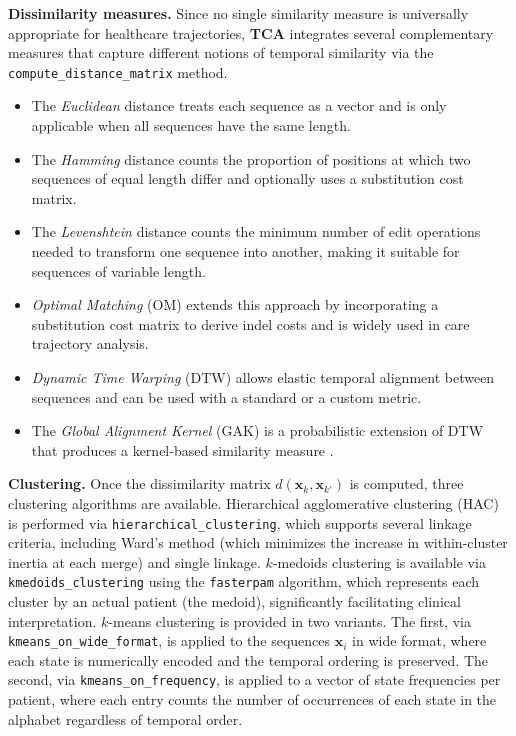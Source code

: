 \documentclass[pdflatex,sn-mathphys-num,referee,lineno]{sn-jnl}
\newcommand{\code}[1]{\texttt{#1}}
\newcommand{\pkg}[1]{\textbf{#1}}
\begin{document}
\textbf{Dissimilarity measures.}
Since no single similarity measure is universally appropriate for healthcare trajectories, \pkg{TCA} integrates several complementary measures that capture different notions of temporal similarity via the \code{compute\_distance\_matrix} method. 
\begin{itemize}
  \item The \emph{Euclidean} distance treats each sequence as a vector and is only applicable when all sequences have the same length. 
  \item The \emph{Hamming} distance counts the proportion of positions at which two sequences of equal length differ and optionally uses a substitution cost matrix.
  \item The \emph{Levenshtein} distance \citep{levenshtein1966binary} counts the minimum number of edit operations needed to transform one sequence into another, making it suitable for sequences of variable length.
  \item \emph{Optimal Matching} (OM) \citep{andjohn1986optimal} extends this approach by incorporating a substitution cost matrix to derive indel costs and is widely used in care trajectory analysis.
  \item \emph{Dynamic Time Warping} (DTW) allows elastic temporal alignment between sequences and can be used with a standard or a custom metric. 
  \item The \emph{Global Alignment Kernel} (GAK) is a probabilistic extension of DTW that produces a kernel-based similarity measure \citep{denteuling2026clustering}.
\end{itemize}

\textbf{Clustering.}
Once the dissimilarity matrix $d(\boldsymbol{x}_k, \boldsymbol{x}_{k'})$ is computed, three clustering algorithms are available. 
Hierarchical agglomerative clustering (HAC) is performed via \code{hierarchical\_clustering}, which supports several linkage criteria, including Ward's method (which minimizes the increase in within-cluster inertia at each merge) and single linkage. 
$k$-medoids clustering \citep{denteuling2026clustering} is available via \code{kmedoids\_clustering} using the \code{fasterpam} algorithm, which represents each cluster by an actual patient (the medoid), significantly facilitating clinical interpretation. 
$k$-means clustering is provided in two variants. The first, via \code{kmeans\_on\_wide\_format}, is applied to the sequences $\boldsymbol{x}_i$ in wide format, where each state is numerically encoded and the temporal ordering is preserved. 
The second, via \code{kmeans\_on\_frequency}, is applied to a vector of state frequencies per patient, where each entry counts the number of occurrences of each state in the alphabet regardless of temporal order.
\end{document}
